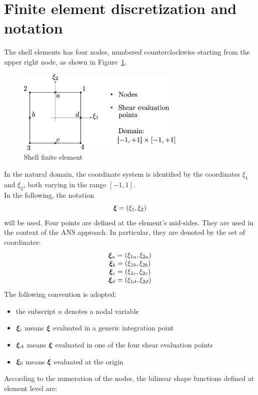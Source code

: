 \section{Finite element discretization and notation}
The shell elements has four nodes, numbered counterclockwise
starting from the upper right node, as shown in Figure~\ref{fig:shell}.
\begin{figure}[htbp]
\centering
\includegraphics[width=8cm]{shellPic.eps}
\caption{Shell finite element}
\label{fig:shell}
\end{figure}
In the natural domain, the coordinate system is identified by the coordinates $\xi_1$ and $\xi_2$, both varying in the range $[-1, 1]$. \\
In the following, the notation
\begin{equation}
\bm{\xi} = \left( \xi_{1},\xi_{2} \right)
\end{equation}
will be used.
Four points are defined at the element's mid-sides.
They are used in the context of the ANS approach.
In particular, they are denoted by the set of coordinates:
\begin{equation}
\vvect{c}{
\T{\xi}_a = \plbr{\xi_{1a},\xi_{2a}} \\
\T{\xi}_b = \plbr{\xi_{1b},\xi_{2b}} \\
\T{\xi}_c = \plbr{\xi_{1c},\xi_{2c}} \\
\T{\xi}_d = \plbr{\xi_{1d},\xi_{2d}}
}
\label{eq:xiSep}
\end{equation}
The following convention is adopted:
\begin{itemize}
	\item the subscript $n$ denotes a nodal variable
  \item $\bm{\xi}_i$ means $\bm{\xi}$ evaluated in a generic integration point
  \item $\bm{\xi}_A$ means $\bm{\xi}$ evaluated in one of the four shear evaluation points
  \item $\bm{\xi}_0$ means $\bm{\xi}$ evaluated at the origin
\end{itemize}
According to the numeration of the nodes, the bilinear shape functions defined at element level are:
